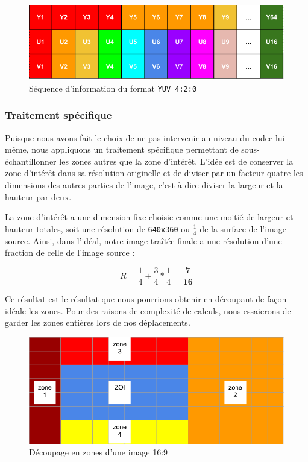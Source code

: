 \documentclass[11pt,a4paper]{article}
\begin{document}
\begin{figure}[H]
\begin{center}
\includegraphics[scale=0.5]{images/yuv2.png}
\end{center}
\caption{Séquence d'information du format \texttt{YUV 4:2:0}}
\label{}
\end{figure}

\bigbreak

\subsubsection{Traitement spécifique}

Puisque nous avons fait le choix de ne pas intervenir au niveau du codec lui-même, nous appliquons un traitement spécifique permettant de sous-échantillonner les zones autres que la zone d'intérêt.
L'idée est de conserver la zone d'intérêt dans sa résolution originelle et de diviser par un facteur quatre les dimensions des autres parties de l'image, c'est-à-dire diviser la largeur et la hauteur par deux.

\bigbreak
La zone d'intérêt a une dimension fixe choisie comme une moitié de largeur et hauteur totales, soit une résolution de \texttt{640x360} ou $\frac{1}{4}$ de la surface de l'image source.
Ainsi, dans l'idéal, notre image traîtée finale a une résolution d'une fraction de celle de l'image source :

$$ R = \frac{1}{4} + \frac{3}{4}*\frac{1}{4} = \mathbf{\frac{7}{16}} $$

Ce résultat est le résultat que nous pourrions obtenir en découpant de façon idéale les zones.
Pour des raisons de complexité de calculs, nous essaierons de garder les zones entières lors de nos déplacements.

\begin{figure}[H]
\begin{center}
\includegraphics[scale=0.4]{images/decoupage.png}
\end{center}
\caption{Découpage en zones d'une image 16:9}
\label{}
\end{figure}
\end{document}
